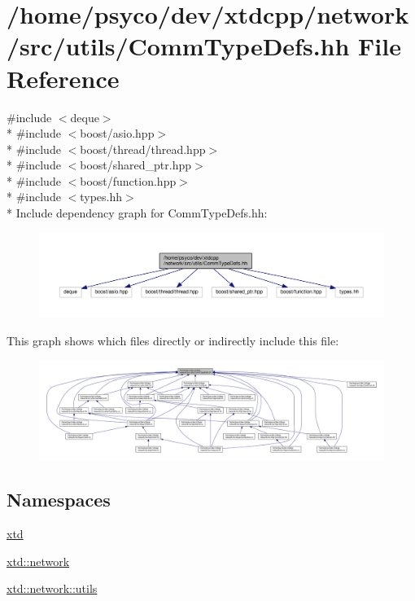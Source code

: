 \hypertarget{CommTypeDefs_8hh}{}\section{/home/psyco/dev/xtdcpp/network/src/utils/\+Comm\+Type\+Defs.hh File Reference}
\label{CommTypeDefs_8hh}
{\ttfamily \#include $<$deque$>$}\\*
{\ttfamily \#include $<$boost/asio.\+hpp$>$}\\*
{\ttfamily \#include $<$boost/thread/thread.\+hpp$>$}\\*
{\ttfamily \#include $<$boost/shared\+\_\+ptr.\+hpp$>$}\\*
{\ttfamily \#include $<$boost/function.\+hpp$>$}\\*
{\ttfamily \#include $<$types.\+hh$>$}\\*
Include dependency graph for Comm\+Type\+Defs.\+hh\+:
\nopagebreak
\begin{figure}[H]
\begin{center}
\leavevmode
\includegraphics[width=350pt]{CommTypeDefs_8hh__incl}
\end{center}
\end{figure}
This graph shows which files directly or indirectly include this file\+:
\nopagebreak
\begin{figure}[H]
\begin{center}
\leavevmode
\includegraphics[width=350pt]{CommTypeDefs_8hh__dep__incl}
\end{center}
\end{figure}
\subsection*{Namespaces}
\begin{DoxyCompactItemize}
\item 
 \hyperlink{namespacextd}{xtd}
\item 
 \hyperlink{namespacextd_1_1network}{xtd\+::network}
\item 
 \hyperlink{namespacextd_1_1network_1_1utils}{xtd\+::network\+::utils}
\end{DoxyCompactItemize}
